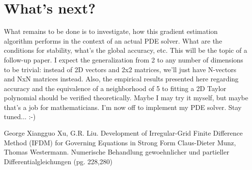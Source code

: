 \section{What's next?}
What remains to be done is to investigate, how this gradient estimation algorithm performs in the context of an actual PDE solver. What are the conditions for stability, what's the global accuracy, etc. This will be the topic of a follow-up paper. I expect the generalization from 2 to any number of dimensions to be trivial: instead of 2D vectors and 2x2 matrices, we'll just have N-vectors and NxN matrices instead. Also, the empirical results presented here regarding accuracy and the equivalence of a neighborhood of 5 to fitting a 2D Taylor polynomial should be verified theoretically. Maybe I may try it myself, but maybe that's a job for mathematicians. I'm now off to implement my PDE solver. Stay tuned... :-)





\begin{thebibliography}{9}  %
  George Xiangguo Xu, G.R. Liu. Development of Irregular-Grid Finite Difference Method (IFDM) for Governing Equations in Strong Form
  Claus-Dieter Munz, Thomas Westermann. Numerische Behandlung gewoehnlicher und partieller Differentialgleichungen (pg. 228,280)
\end{thebibliography}









% 

